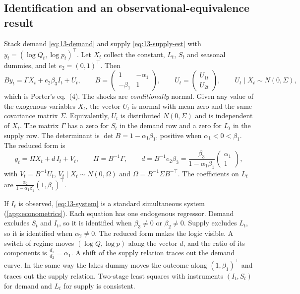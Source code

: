 \subsection{Identification and an observational-equivalence result}\label{sec:13-switching-id}

Stack demand \eqref{eq:13-demand} and supply \eqref{eq:13-supply-est} with $y_t = (\log Q_t, \log p_t)^\top$. Let
$X_t$ collect the constant, $L_t$, $S_t$ and seasonal dummies, and let $e_2 = (0,1)^\top$. Then
\begin{equation}\label{eq:13-system}
  B y_t = \Gamma X_t + e_2 \beta_3 I_t + U_t, \qquad
  B = \begin{pmatrix} 1 & -\alpha_1 \\ -\beta_1 & 1 \end{pmatrix}, \qquad
  U_t = \begin{pmatrix} U_{1t} \\ U_{2t}\end{pmatrix}, \qquad U_t \mid X_t \sim N(0, \Sigma),
\end{equation}
which is Porter's eq.~(4). The shocks are \emph{conditionally} normal. Given any value of the exogenous variables
$X_t$, the vector $U_t$ is normal with mean zero and the same covariance matrix $\Sigma$. Equivalently, $U_t$ is
distributed $N(0,\Sigma)$ and is independent of $X_t$. The matrix $\Gamma$ has a zero for $S_t$ in the demand row and a zero for $L_t$ in the
supply row. The determinant is $\det B = 1 - \alpha_1\beta_1$, positive when $\alpha_1 < 0 < \beta_1$. The reduced
form is
\begin{equation}\label{eq:13-reduced}
  y_t = \Pi X_t + d\, I_t + V_t, \qquad \Pi = B^{-1}\Gamma, \qquad
  d = B^{-1}e_2\beta_3 = \frac{\beta_3}{1 - \alpha_1\beta_1}\begin{pmatrix}\alpha_1 \\ 1\end{pmatrix},
\end{equation}
with $V_t = B^{-1}U_t$, $V_t \mid X_t \sim N(0, \Omega)$ and $\Omega = B^{-1}\Sigma B^{-\top}$. The coefficients on $L_t$ are
$\frac{\alpha_2}{1-\alpha_1\beta_1}(1, \beta_1)^\top$.

If $I_t$ is observed, \eqref{eq:13-system} is a standard simultaneous system (\cref{app:econometrics}). Each
equation has one endogenous regressor. Demand excludes $S_t$ and $I_t$, so it is identified when $\beta_3 \ne 0$
or $\beta_2 \ne 0$. Supply excludes $L_t$, so it is identified when $\alpha_2 \ne 0$. The reduced form makes the
logic visible. A switch of regime moves $(\log Q, \log p)$ along the vector $d$, and the ratio of its components is
$\frac{d_1}{d_2} = \alpha_1$. A shift of the supply relation traces out the demand curve. In the same way the
lakes dummy moves the outcome along $(1, \beta_1)^\top$ and traces out the supply relation. Two-stage least squares
with instruments $(I_t, S_t)$ for demand and $L_t$ for supply is consistent.

